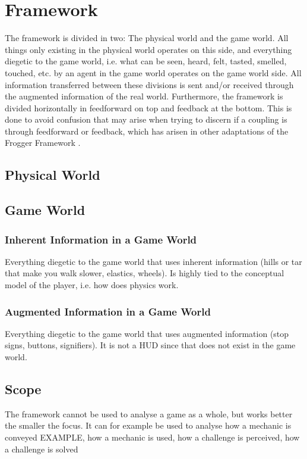 \section{Framework}

The framework is divided in two: The physical world and the game world. All things only existing in the physical world operates on this side, and everything diegetic to the game world, i.e. what can be seen, heard, felt, tasted, smelled, touched, etc. by an agent in the game world operates on the game world side. All information transferred between these divisions is sent and/or received through the augmented information of the real world.
Furthermore, the framework is divided horizontally in feedforward on top and feedback at the bottom. This is done to avoid confusion that may arise when trying to discern if a coupling is through feedforward or feedback, which has arisen in other adaptations of the Frogger Framework \cite{tangifrog}.

\subsection{Physical World}


\subsection{Game World}

\subsubsection{Inherent Information in a Game World}
Everything diegetic to the game world that uses inherent information (hills or tar that make you walk slower, elastics, wheels). Is highly tied to the conceptual model of the player, i.e. how does physics work.

\subsubsection{Augmented Information in a Game World}
Everything diegetic to the game world that uses augmented information (stop signs, buttons, signifiers). It is not a HUD since that does not exist in the game world.

\subsection{Scope}
The framework cannot be used to analyse a game as a whole, but works better the smaller the focus. It can for example be used to analyse how a mechanic is conveyed EXAMPLE, how a mechanic is used, how a challenge is perceived, how a challenge is solved
